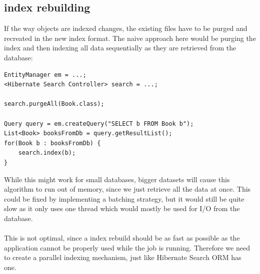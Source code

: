 \subsection{index rebuilding}
If the way objects are indexed changes, the existing files have to be purged and recreated in the new index format. The naive approach here would be purging the index and then indexing all data sequentially as they are retrieved from the database:
\\
\lstset{language=java}
\begin{lstlisting}[frame=htrbl, caption={naive index rebuilding}, label={lst:naiveIndexing}]
EntityManager em = ...;
<Hibernate Search Controller> search = ...;

search.purgeAll(Book.class);

Query query = em.createQuery("SELECT b FROM Book b");
List<Book> booksFromDb = query.getResultList();
for(Book b : booksFromDb) {
	search.index(b);
}
\end{lstlisting}
While this might work for small databases, bigger datasets will cause this algorithm to run out of memory, since we just retrieve all the data at once. This could be fixed by implementing a batching strategy, but it would still be quite slow as it only uses one thread which would mostly be used for I/O from the database.
\\\\
This is not optimal, since a index rebuild should be as fast as possible as the application cannot be properly used while the job is running. Therefore we need to create a parallel indexing mechanism, just like Hibernate Search ORM has one.

